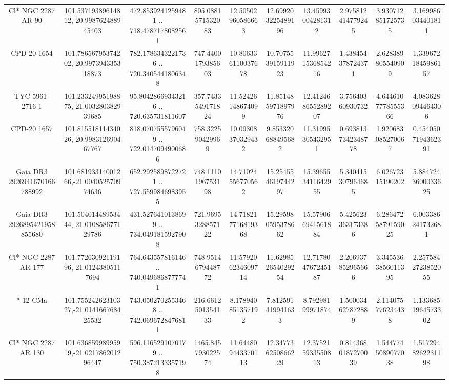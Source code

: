 \begin{table}
\begin{tabular}{cccccccccc}
Cl* NGC 2287     AR      90 & 101.53719389614812,-20.998762488945403 & 472.8539241259481 .. 718.4787178082561 & 805.0881571532083 & 12.50502960586663 & 12.699203225489196 & 13.45993004281312 & 2.975812414779245 & 3.930712851725735 & 3.169986034401811 \\
CPD-20  1654 & 101.78656795374202,-20.997394335318873 & 782.1786343221736 .. 720.3405441806348 & 747.4400179385603 & 10.806336110037678 & 10.707553915911923 & 11.996271536854216 & 1.438454378724371 & 2.628389805540909 & 1.3396721845986157 \\
TYC 5961-2716-1 & 101.23324995198875,-21.003280382939685 & 95.80428669343216 .. 720.635731811607 & 357.7433549171824 & 11.52426148674099 & 11.851485971897976 & 12.412468655289207 & 3.75640360930732 & 4.6446107778555366 & 4.083628094464306 \\
CPD-20  1657 & 101.81551811434026,-20.998312690467767 & 818.0707555796049 .. 722.0147094900686 & 758.322590429969 & 10.09308370329432 & 9.853320688495682 & 11.31995305432951 & 0.6938137342348778 & 1.920683085270067 & 0.4540507194362391 \\
Gaia DR3 2926941670166788992 & 101.68193314001266,-21.004052570974636 & 652.2925898722721 .. 727.5599846983955 & 748.1110196753198 & 14.71024556770562 & 15.254554619744297 & 15.396553411642955 & 5.340415307964685 & 6.02672315190202 & 5.8847243600033625 \\
Gaia DR3 2926895421958855680 & 101.50401448953444,-21.010858677129786 & 431.5276410138699 .. 734.0491815927908 & 721.9695328857122 & 14.718217716819368 & 15.295980595378662 & 15.579066941561884 & 5.425623363173386 & 6.2864725879159025 & 6.003386241732681 \\
Cl* NGC 2287     AR     177 & 101.77263092119196,-21.01243805117694 & 764.643557816146 .. 740.0496868777741 & 748.9514679448772 & 11.579206234609714 & 11.629852654029254 & 12.717804767245187 & 2.206937852965666 & 3.3455363856011395 & 2.2575842723852055 \\
*  12 CMa & 101.75524262310327,-21.014166768425532 & 743.0502702553468 .. 742.0696728476811 & 216.6612501354133 & 8.178940851357192 & 7.812591419941633 & 8.79298199971874 & 1.500034627872889 & 2.114075776234438 & 1.1336851964573302 \\
Cl* NGC 2287     AR     130 & 101.63685998995919,-21.021786201296447 & 596.1165291070179 .. 750.3872133357198 & 1465.845793022574 & 11.644809443370113 & 12.347736250866229 & 12.375215933550813 & 0.8143680187270039 & 1.5447745089077038 & 1.5172948262231198 \\

\end{tabular}
\end{table}
